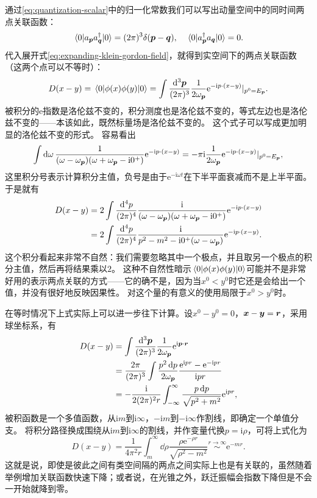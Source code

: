 \documentclass[hyperref, UTF8, a4paper]{ctexart}
\newcommand*{\ii}{\mathrm{i}}
\newcommand*{\ee}{\mathrm{e}}
\begin{document}
通过\eqref{eq:quantization-scalar}中的归一化常数我们可以写出动量空间中的同时间两点关联函数：
\begin{equation}
    \mel{0}{a_{\vb*{p}} a^\dagger_{\vb*{q}}}{0} = (2\pi)^3 \delta(\vb*{p} - \vb*{q}), \quad \mel{0}{a^\dagger_{\vb*{p}} a_{\vb*{q}}}{0} = 0.
\end{equation}
代入展开式\eqref{eq:expanding-klein-gordon-field}，就得到实空间下的两点关联函数（这两个点可以不等时）：
\begin{equation}
    D(x-y) = \mel{0}{\phi(x) \phi(y)}{0} = \int \frac{\dd[3]{\vb*{p}}}{(2\pi)^3} \frac{1}{2 \omega_{\vb*{p}}} \ee^{-\ii p \cdot (x - y)} |_{p^0 = E_{\vb*{p}}} .
\end{equation}
被积分的$\ee$指数是洛伦兹不变的，积分测度也是洛伦兹不变的，等式左边也是洛伦兹不变的——本该如此，既然标量场是洛伦兹不变的。
这个式子可以写成更加明显的洛伦兹不变的形式。
容易看出
\[
    \int \dd{\omega} \frac{1}{(\omega - \omega_{\vb*{p}})(\omega + \omega_{\vb*{p}}  - \ii 0^+)} \ee^{-\ii p \cdot (x - y)} = - \pi \ii \frac{1}{2 \omega_{\vb*{p}}} \ee^{-\ii p \cdot (x - y)} |_{p^0 = E_{\vb*{p}}} ,
\]
这里积分号表示计算积分主值，负号是由于$\ee^{-\ii \omega t}$在下半平面衰减而不是上半平面。
于是就有
\begin{equation}
    \begin{aligned}
        D(x-y) &= 2 \int \frac{\dd[4]{p}}{(2\pi)^4} \frac{\ii}{(\omega - \omega_{\vb*{p}})(\omega + \omega_{\vb*{p}}  - \ii 0^+)} \ee^{-\ii p \cdot (x - y)} \\
        &= 2 \int \frac{\dd[4]{p}}{(2\pi)^4} \frac{\ii}{p^2 - m^2 - \ii 0^+ (\omega - \omega_{\vb*{p}})} \ee^{-\ii p \cdot (x - y)}.
    \end{aligned}
\end{equation}
这个积分看起来非常不自然：我们需要忽略其中一个极点，并且取另一个极点的积分主值，然后再将结果乘以$2$。
这种不自然性暗示$\mel*{0}{\phi(x) \phi(y)}{0}$可能并不是非常好用的表示两点关联的方式——它的确不是，因为当$x^0 < y^0$时它还是会给出一个值，并没有很好地反映因果性。
对这个量的有意义的使用局限于$x^0 > y^0$时。

在等时情况下上式实际上可以进一步往下计算。设$x^0-y^0=0$，$\vb*{x} - \vb*{y} = \vb*{r}$，采用球坐标系，有
\[
    \begin{aligned}
        D(x-y) &= \int \frac{\dd[3]{\vb*{p}}}{(2\pi)^3} \frac{1}{2 \omega_{\vb*{p}}} \ee^{\ii \vb*{p} \cdot \vb*{r}} \\
        &= \frac{2\pi}{(2\pi)^3} \int \frac{p^2 \dd{p}}{2 \omega_{\vb*{p}}} \frac{\ee^{\ii p r} - \ee^{- \ii p r}}{\ii p r} \\
        &= - \frac{\ii}{2 (2\pi)^2 r} \int_{-\infty}^\infty \frac{p \dd{p}}{\sqrt{p^2 + m^2}} \ee^{\ii p r},
    \end{aligned}
\]
被积函数是一个多值函数，从$\ii m$到$\ii \infty$，$- \ii m$到$- \ii \infty$作割线，即确定一个单值分支。
将积分路径换成围绕从$\ii m$到$\ii \infty$的割线，并作变量代换$p = \ii \rho$，可将上式化为
\[
    D(x-y) = \frac{1}{4\pi^2 r} \int_{m}^\infty \dd{\rho} \frac{\rho \ee^{-\rho r}}{\sqrt{\rho^2 - m^2}} \stackrel{r \to \infty}{\sim} \ee^{- m r}.
\]
这就是说，即使是彼此之间有类空间隔的两点之间实际上也是有关联的，虽然随着举例增加关联函数快速下降；或者说，在光锥之外，跃迁振幅会指数下降但是不会一开始就降到零。
\end{document}
